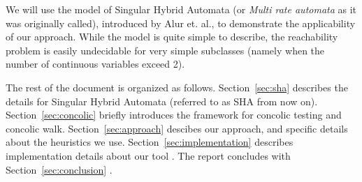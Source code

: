 We will use the model of Singular Hybrid Automata (or \emph{Multi rate automata}
as it was originally called), introduced by Alur et. al., 
to demonstrate the applicability of our approach. 
While the model is quite simple to describe, the reachability problem is
easily undecidable for very simple subclasses (namely when the number of continuous variables
exceed 2).


The rest of the document is organized as follows.
Section~\ref{sec:sha} describes the details for Singular Hybrid Automata
(referred to as SHA from now on).
Section~\ref{sec:concolic} briefly introduces the framework for
concolic testing and concolic walk.
Section~\ref{sec:approach} descibes our approach, and specific details about
the heuristics we use.
Section~\ref{sec:implementation} describes implementation details about our tool \tool.
The report concludes with Section~\ref{sec:conclusion} .

